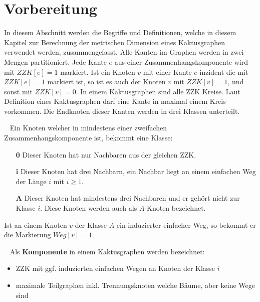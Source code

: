 \section{Vorbereitung}
\vspace{-4mm}
In diesem Abschnitt werden die Begriffe und Definitionen, welche in diesem Kapitel zur Berechnung der metrischen Dimension eines Kaktusgraphen verwendet werden, zusammengefasst.
\newline\newline
Alle Kanten im Graphen werden in zwei Mengen partitioniert. Jede Kante $e$ aus einer Zusammenhangskomponente wird mit $ZZK[e]=1$ markiert. Ist ein Knoten $v$ mit einer Kante $e$ inzident die mit $ZZK[e]=1$ markiert ist, so ist es auch der Knoten $v$ mit $ZZK[v]=1$, und sonst mit $ZZK[v]=0$.\newline\newline
In einem Kaktusgraphen sind alle ZZK Kreise. Laut Definition eines Kaktusgraphen darf eine Kante in maximal einem Kreis vorkommen. Die Endknoten dieser Kanten werden in drei Klassen unterteilt.
\begin{defi}~\newline
Ein Knoten welcher in mindestens einer zweifachen Zusammenhangskomponente ist, bekommt eine Klasse:
\begin{itemize}
\item[\textbf{0}] Dieser Knoten hat nur Nachbaren aus der gleichen ZZK.
\item[\textbf{i}] Dieser Knoten hat drei Nachbarn, ein Nachbar liegt an einem einfachen Weg der Länge $i$ mit $i \geq 1$.
\item[\textbf{A}] Dieser Knoten hat mindestens drei Nachbaren und er gehört nicht zur Klasse $i$. Diese Knoten werden auch als $A$-Knoten bezeichnet.
\end{itemize}
\end{defi}
Ist an einem Knoten $v$ der Klasse $A$ ein induzierter einfacher Weg, so bekommt er die Markierung $Weg[v]=1$.
\begin{defi}[Komponente]~\newline
Als \textbf{Komponente} in einem Kaktusgraphen werden bezeichnet:
\begin{itemize}
\item ZZK mit ggf. induzierten einfachen Wegen an Knoten der Klasse $i$
\item maximale Teilgraphen inkl. Trennungsknoten welche Bäume, aber keine Wege sind 
\end{itemize}
\end{defi}
